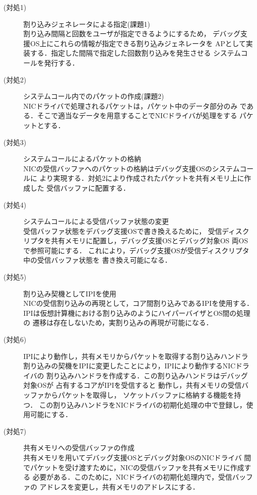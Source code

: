 \documentclass[tanilab-enum]{graduate}
\begin{document}
\begin{description}
    \item[(対処1)]割り込みジェネレータによる指定(課題1)\\
        割り込み間隔と回数をユーザが指定できるようにするため，
        デバッグ支援OS上にこれらの情報が指定できる割り込みジェネレータを
        APとして実装する．指定した間隔で指定した回数割り込みを発生させる
        システムコールを発行する．
    \item[(対処2)]システムコール内でのパケットの作成(課題2)\\
        NICドライバで処理されるパケットは，パケット中のデータ部分のみ
        である．そこで適当なデータを用意することでNICドライバが処理をする
        パケットとする．
    \item[(対処3)]システムコールによるパケットの格納\\
        NICの受信バッファへのパケットの格納はデバッグ支援OSのシステムコールに
        より実現する．対処2により作成されたパケットを共有メモリ上に作成した
        受信バッファに配置する．
    \item[(対処4)]システムコールによる受信バッファ状態の変更\\
        受信バッファ状態をデバッグ支援OSで書き換えるために，
        受信ディスクリプタを共有メモリに配置し，デバッグ支援OSとデバッグ対象OS
        両OSで参照可能にする．
        これにより，デバッグ支援OSが受信ディスクリプタ中の受信バッファ状態を
        書き換え可能になる．
    \item[(対処5)]割り込み契機としてIPIを使用\\
        NICの受信割り込みの再現として，コア間割り込みであるIPIを使用する．
        IPIは仮想計算機における割り込みのようにハイパーバイザとOS間の処理の
        遷移は存在しないため，実割り込みの再現が可能になる．
    \item[(対処6)]IPIにより動作し，共有メモリからパケットを取得する割り込みハンドラ\\
        割り込みの契機をIPIに変更したことにより，IPIにより動作するNICドライバの
        割り込みハンドラを作成する．この割り込みハンドラはデバッグ対象OSが
        占有するコアがIPIを受信すると
        動作し，共有メモリの受信バッファからパケットを取得し，
        ソケットバッファに格納する機能を持つ．
        この割り込みハンドラをNICドライバの初期化処理の中で登録し，使用可能にする．
    \item[(対処7)]共有メモリへの受信バッファの作成\\
        共有メモリを用いてデバッグ支援OSとデバッグ対象OSのNICドライバ
        間でパケットを受け渡すために，NICの受信バッファを共有メモリに作成する
        必要がある．このために，NICドライバの初期化処理内で，受信バッファの
        アドレスを変更し，共有メモリのアドレスにする．

\end{description}
\end{document}
